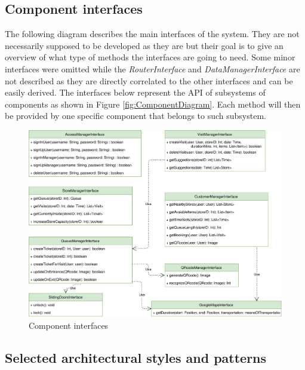 \documentclass[]{article}
\begin{document}
	\subsection{Component interfaces}
	
	The following diagram describes the main interfaces of the system. \newline
	They are not necessarily supposed to be developed as they are but their goal is to give an overview of what type of methods the interfaces are going to need. \newline
	Some minor interfaces were omitted while the \textit{RouterInterface} and \textit{DataManagerInterface} are not described as they are directly correlated to the other interfaces and can be easily derived. \newline
	The interfaces below represent the API of subsystems of components as shown in Figure \ref{fig:ComponentDiagram}. Each method will then be provided by one specific component that belongs to such subsystem.\newline
	
		\begin{figure}[H]
			\centering
			\includegraphics[scale=0.7]{ComponentView/componentInterfaces.png}
			\caption{Component interfaces}
			\label{fig:componentInterfaces}
		\end{figure}
	
	\newpage
	\subsection{Selected architectural styles and patterns}
	\medskip
	
\end{document}
